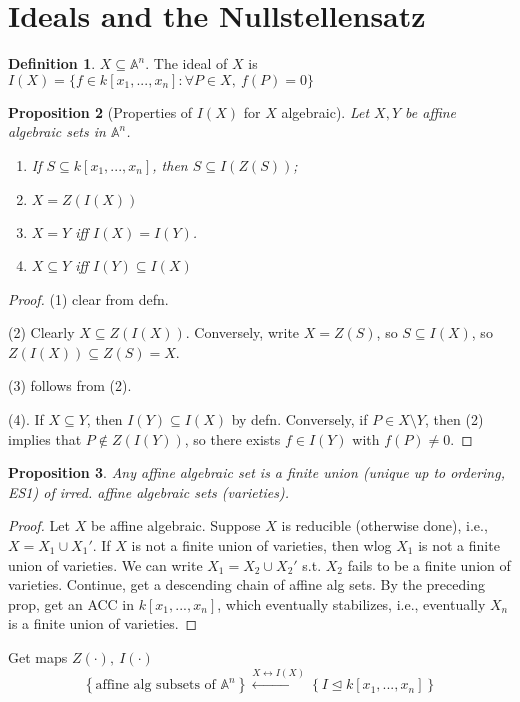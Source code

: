 \documentclass{article}
\theoremstyle{definition}
\newtheorem{defn}{Definition}[section]
\theoremstyle{remark}
\theoremstyle{plain}
\newtheorem{prop}[defn]{Proposition}
\newcommand{\bA}{\mathbb{A}}
\begin{document}
\section{Ideals and the Nullstellensatz}
\begin{defn}
    $X\subseteq \bA^n$. The ideal of $X$ is $I(X)=\{f\in k[x_1,...,x_n]:\forall P\in X,\ f(P)=0\}$
\end{defn}
\begin{prop}[Properties of $I(X)$ for $X$ algebraic]
    Let $X, Y$ be affine algebraic sets in $\bA^n$.
    \begin{enumerate}[(1)]
        \item If $S\subseteq k[x_1,...,x_n]$, then $S\subseteq I(Z(S))$;
        \item $X=Z(I(X))$
        \item $X=Y$ iff $I(X)=I(Y)$.
        \item $X\subseteq Y$ iff $I(Y)\subseteq I(X)$
    \end{enumerate}
\end{prop}
\begin{proof}
    (1) clear from defn. 

    (2) Clearly $X\subseteq Z(I(X))$. Conversely, write $X=Z(S)$, so $S\subseteq I(X)$, so $Z(I(X))\subseteq Z(S)=X$.

    (3) follows from (2).

    (4). If $X\subseteq Y$, then $I(Y)\subseteq I(X)$ by defn. Conversely, if $P\in X\setminus Y$, then (2) implies that $P\not\in Z(I(Y))$, so there exists $f\in I(Y)$ with $f(P)\neq 0$.
\end{proof}
\begin{prop}
    Any affine algebraic set is a finite union (unique up to ordering, ES1) of irred. affine algebraic sets (varieties).
\end{prop}
\begin{proof}
    Let $X$ be affine algebraic. Suppose $X$ is reducible (otherwise done), i.e., $X=X_1\cup X_1'$. If $X$ is not a finite union of varieties, then wlog $X_1$ is not a finite union of varieties. We can write $X_1=X_2\cup X_2'$ s.t. $X_2$ fails to be a finite union of varieties. Continue, get a descending chain of affine alg sets. By the preceding prop, get an ACC in $k[x_1,...,x_n]$, which eventually stabilizes, i.e., eventually $X_n$ is a finite union of varieties.
\end{proof}
Get maps $Z(\cdot ),\ I(\cdot )$
\[\left\{\text{affine alg subsets of }\bA^n\right\}\overset{X\leftrightarrow I(X)}{\longleftrightarrow}\left\{I\trianglelefteq k[x_1,...,x_n]\right\}\]
\end{document}
